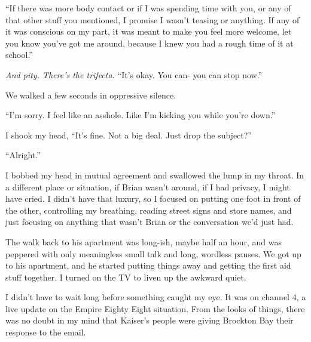 ``If there was more body contact or if I was spending time with you, or any of that other stuff you mentioned, I promise I wasn't teasing or anything.  If any of it was conscious on my part, it was meant to make you feel more welcome, let you know you've got me around, because I knew you had a rough time of it at school.''



\emph{And pity.  There's the trifecta.  }``It's okay.  You can- you can stop now.''



We walked a few seconds in oppressive silence.



``I'm sorry.  I feel like an asshole.  Like I'm kicking you while you're down.''



I shook my head, ``It's fine.  Not a big deal.  Just drop the subject?''



``Alright.''



I bobbed my head in mutual agreement and swallowed the lump in my throat.  In a different place or situation, if Brian wasn't around, if I had privacy, I might have cried.  I didn't have that luxury, so I focused on putting one foot in front of the other, controlling my breathing, reading street signs and store names, and just focusing on anything that wasn't Brian or the conversation we'd just had.



The walk back to his apartment was long-ish, maybe half an hour, and was peppered with only meaningless small talk and long, wordless pauses.  We got up to his apartment, and he started putting things away and getting the first aid stuff together.  I turned on the TV to liven up the awkward quiet.



I didn't have to wait long before something caught my eye.  It was on channel 4, a live update on the Empire Eighty Eight situation.  From the looks of things, there was no doubt in my mind that Kaiser's people were giving Brockton Bay their response to the email.





